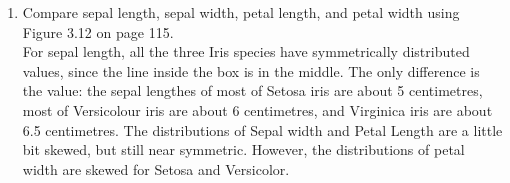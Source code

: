 \documentclass{article}%
\begin{document}
\begin{enumerate}
\begin{enumerate}
		\item Compare sepal length, sepal width, petal length, and petal width using Figure 3.12 on page 115. \\
		
		For sepal length, all the three Iris species have symmetrically distributed values, since the line inside the box is in the middle. The only difference is the value: the sepal lengthes of most of Setosa iris are about 5 centimetres, most of Versicolour iris are about 6 centimetres, and Virginica iris are about 6.5 centimetres. The distributions of Sepal width and Petal Length are a little bit skewed, but still near symmetric. However, the distributions of petal width are skewed for Setosa and Versicolor.
 \end{enumerate}



\end{enumerate}
\end{document}
